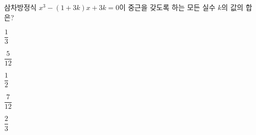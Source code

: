 삼차방정식 $x^3-(1+3k)x+3k=0$이 중근을 갖도록 하는 모든 실수 $k$의 값의 합은?
\begin{choices32}{\rule[-3ex]{0pt}{8ex}$\dfrac{1}{3}$}{\rule[-3ex]{0pt}{8ex}$\dfrac{5}{12}$}{\rule[-3ex]{0pt}{8ex}$\dfrac{1}{2}$}{\rule[-3ex]{0pt}{8ex}$\dfrac{7}{12}$}{\rule[-3ex]{0pt}{8ex}$\dfrac{2}{3}$}\end{choices32}
